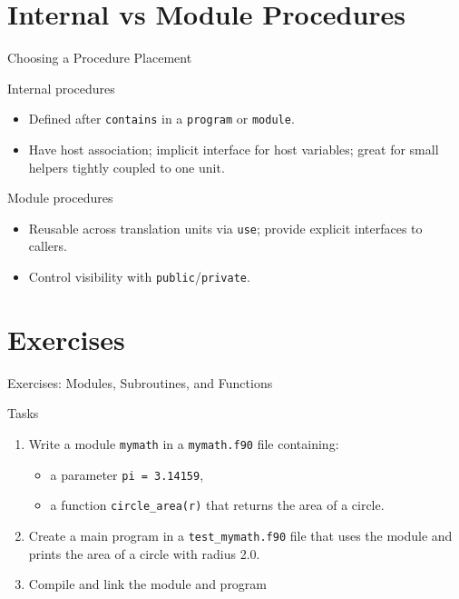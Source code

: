 \section{Internal vs Module Procedures}

\begin{frame}{Choosing a Procedure Placement}
  \begin{block}{Internal procedures}
    \begin{itemize}
      \item Defined after \texttt{contains} in a \texttt{program} or \texttt{module}.
      \item Have host association; implicit interface for host variables; great for small helpers tightly coupled to one unit.
    \end{itemize}
  \end{block}
  \begin{block}{Module procedures}
    \begin{itemize}
      \item Reusable across translation units via \texttt{use}; provide explicit interfaces to callers.
      \item Control visibility with \texttt{public}/\texttt{private}.
    \end{itemize}
  \end{block}
\end{frame}


\section{Exercises}
\begin{frame}{Exercises: Modules, Subroutines, and Functions}
	\begin{block}{Tasks}
		\begin{enumerate}
			\item Write a module \texttt{mymath} in a \texttt{mymath.f90} file containing:
			\begin{itemize}
				\item a parameter \texttt{pi = 3.14159},
				\item a function \texttt{circle\_area(r)} that returns the area of a circle.
			\end{itemize}
			\item Create a main program in a \texttt{test\_mymath.f90} file that uses the module and prints the area of a circle with radius 2.0.
			\item Compile and link the module and program
		\end{enumerate}
	\end{block}
\end{frame}


